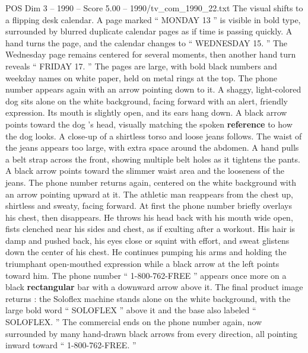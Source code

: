 \begin{textsample}{POS Dim 3 – 1990 – Score 5.00 – 1990/tv\_com\_1990\_22.txt}
The visual shifts to a flipping desk calendar.
A page marked “ MONDAY 13 ” is visible in bold type, surrounded by blurred duplicate calendar pages as if time is passing quickly.
A hand turns the page, and the calendar changes to “ WEDNESDAY 15. ” The Wednesday page remains centered for several moments, then another hand turn reveals “ FRIDAY 17. ” The pages are large, with bold black numbers and weekday names on white paper, held on metal rings at the top.
The phone number appears again with an arrow pointing down to it.
A shaggy, light-colored dog sits alone on the white background, facing forward with an alert, friendly expression.
Its mouth is slightly open, and its ears hang down.
A black arrow points toward the dog ’s head, visually matching the spoken \textbf{reference} to how the dog looks.
A close-up of a shirtless torso and loose jeans follows.
The waist of the jeans appears too large, with extra space around the abdomen.
A hand pulls a belt strap across the front, showing multiple belt holes as it tightens the pants.
A black arrow points toward the slimmer waist area and the looseness of the jeans.
The phone number returns again, centered on the white background with an arrow pointing upward at it.
The athletic man reappears from the chest up, shirtless and sweaty, facing forward.
At first the phone number briefly overlays his chest, then disappears.
He throws his head back with his mouth wide open, fists clenched near his sides and chest, as if exulting after a workout.
His hair is damp and pushed back, his eyes close or squint with effort, and sweat glistens down the center of his chest.
He continues pumping his arms and holding the triumphant open-mouthed expression while a black arrow at the left points toward him.
The phone number “ 1-800-762-FREE ” appears once more on a black \textbf{rectangular} bar with a downward arrow above it.
The final product image returns : the Soloflex machine stands alone on the white background, with the large bold word “ SOLOFLEX ” above it and the base also labeled “ SOLOFLEX. ” The commercial ends on the phone number again, now surrounded by many hand-drawn black arrows from every direction, all pointing inward toward “ 1-800-762-FREE. ”

\end{textsample}
